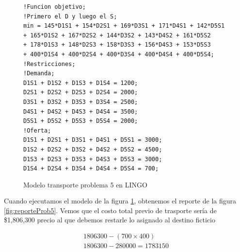\documentclass[12pt]{article}  %
\begin{document}
\begin{figure}[H]
	\centering
	\caption{Modelo transporte problema 5 en LINGO}
	\label{fig:lingoProb5}
	\begin{verbatim}
!Funcion objetivo;
!Primero el D y luego el S;
min = 145*D1S1 + 154*D2S1 + 169*D3S1 + 171*D4S1 + 142*D5S1
+ 165*D1S2 + 167*D2S2 + 144*D3S2 + 143*D4S2 + 161*D5S2
+ 178*D1S3 + 148*D2S3 + 158*D3S3 + 156*D4S3 + 153*D5S3
+ 400*D1S4 + 400*D2S4 + 400*D3S4 + 400*D4S4 + 400*D5S4;
!Restricciones;
!Demanda;
D1S1 + D1S2 + D1S3 + D1S4 = 1200;
D2S1 + D2S2 + D2S3 + D2S4 = 2000;
D3S1 + D3S2 + D3S3 + D3S4 = 2500;
D4S1 + D4S2 + D4S3 + D4S4 = 3500;
D5S1 + D5S2 + D5S3 + D5S4 = 2000;
!Oferta;
D1S1 + D2S1 + D3S1 + D4S1 + D5S1 = 3000;
D1S2 + D2S2 + D3S2 + D4S2 + D5S2 = 4500;
D1S3 + D2S3 + D3S3 + D4S3 + D5S3 = 3000;
D1S4 + D2S4 + D3S4 + D4S4 + D5S4 = 700;
	\end{verbatim}
\end{figure}

Cuando ejecutamos el modelo de la figura \ref{fig:lingoProb5}, obtenemos el reporte de la figura \ref{fig:reporteProb5}. Vemos que el costo total previo de trasporte sería de \$1,806,300 precio al que debemos restarle lo asignado al destino ficticio 

\begin{align}
1806300 - (700 \times 400) \\ 
1806300 - 280000 = 1783150
\end{align}
\end{document}

